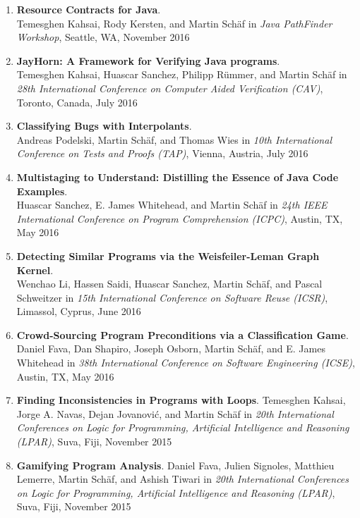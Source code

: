 \begin{enumerate}
\item \textbf{Resource Contracts for Java}.
\\ Temesghen Kahsai, Rody Kersten, and Martin Sch\"af in 
\emph{Java PathFinder Workshop},
Seattle, WA, November 2016

\item \textbf{JayHorn: A Framework for Verifying Java programs}.
\\ Temesghen Kahsai, Huascar Sanchez, Philipp R\"ummer, and Martin Sch\"af in 
\emph{28th International Conference on Computer Aided Verification (CAV)},
Toronto, Canada, July 2016


\item \textbf{Classifying Bugs with Interpolants}.
\\ Andreas Podelski, Martin Sch\"af, and Thomas Wies in 
\emph{10th International Conference on Tests and Proofs (TAP)},
Vienna, Austria, July 2016


\item \textbf{Multistaging to Understand: Distilling the Essence of Java Code Examples}.
\\ Huascar Sanchez, E. James Whitehead, and Martin Sch\"af in 
\emph{24th IEEE International Conference on Program Comprehension (ICPC)},
Austin, TX, May 2016


\item \textbf{Detecting Similar Programs via the Weisfeiler-Leman Graph Kernel}.
\\ Wenchao Li, Hassen Saidi, Huascar Sanchez, Martin Sch\"af, and Pascal
Schweitzer in \emph{15th International Conference on Software Reuse (ICSR)},
Limassol, Cyprus, June 2016


\item \textbf{Crowd-Sourcing Program Preconditions via a Classification Game}.
\\ Daniel Fava, Dan Shapiro, Joseph Osborn, Martin Sch\"af, and E. James
Whitehead in \emph{38th International Conference on Software Engineering (ICSE)}, Austin,
TX, May 2016


\item \textbf{Finding Inconsistencies in Programs with Loops}.
Temesghen Kahsai, Jorge A. Navas, Dejan Jovanovi\'c, and Martin Sch\"af
in \emph{20th International Conferences on Logic for Programming, Artificial Intelligence and Reasoning (LPAR)}, Suva, Fiji, November
2015

\item \textbf{Gamifying Program Analysis}.
Daniel Fava, Julien Signoles, Matthieu Lemerre, Martin Sch\"af, and Ashish Tiwari
in \emph{20th International Conferences on Logic for Programming, Artificial Intelligence and Reasoning (LPAR)}, Suva, Fiji, November
2015


\end{enumerate}
